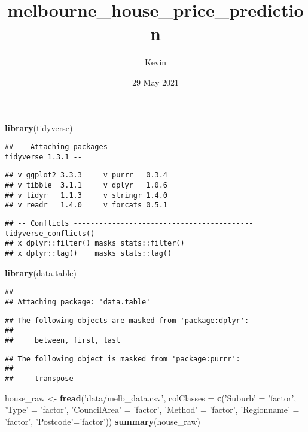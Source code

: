 \documentclass[]{article}
\title{melbourne\_house\_price\_prediction}
\author{Kevin}
\date{29 May 2021}
\newenvironment{Shaded}{\begin{snugshade}}{\end{snugshade}}
\newcommand{\DataTypeTok}[1]{\textcolor[rgb]{0.13,0.29,0.53}{#1}}
\newcommand{\KeywordTok}[1]{\textcolor[rgb]{0.13,0.29,0.53}{\textbf{#1}}}
\newcommand{\NormalTok}[1]{#1}
\newcommand{\StringTok}[1]{\textcolor[rgb]{0.31,0.60,0.02}{#1}}
\begin{document}
\maketitle

\begin{Shaded}
\begin{Highlighting}[]
\KeywordTok{library}\NormalTok{(tidyverse)}
\end{Highlighting}
\end{Shaded}

\begin{verbatim}
## -- Attaching packages --------------------------------------- tidyverse 1.3.1 --
\end{verbatim}

\begin{verbatim}
## v ggplot2 3.3.3     v purrr   0.3.4
## v tibble  3.1.1     v dplyr   1.0.6
## v tidyr   1.1.3     v stringr 1.4.0
## v readr   1.4.0     v forcats 0.5.1
\end{verbatim}

\begin{verbatim}
## -- Conflicts ------------------------------------------ tidyverse_conflicts() --
## x dplyr::filter() masks stats::filter()
## x dplyr::lag()    masks stats::lag()
\end{verbatim}

\begin{Shaded}
\begin{Highlighting}[]
\KeywordTok{library}\NormalTok{(data.table)}
\end{Highlighting}
\end{Shaded}

\begin{verbatim}
## 
## Attaching package: 'data.table'
\end{verbatim}

\begin{verbatim}
## The following objects are masked from 'package:dplyr':
## 
##     between, first, last
\end{verbatim}

\begin{verbatim}
## The following object is masked from 'package:purrr':
## 
##     transpose
\end{verbatim}

\begin{Shaded}
\begin{Highlighting}[]
\NormalTok{house_raw <-}\StringTok{ }\KeywordTok{fread}\NormalTok{(}\StringTok{'data/melb_data.csv'}\NormalTok{, }\DataTypeTok{colClasses =} \KeywordTok{c}\NormalTok{(}\StringTok{'Suburb'}\NormalTok{ =}\StringTok{ 'factor'}\NormalTok{, }\StringTok{'Type'}\NormalTok{ =}\StringTok{ 'factor'}\NormalTok{, }\StringTok{'CouncilArea'}\NormalTok{ =}\StringTok{ 'factor'}\NormalTok{,}
                                                        \StringTok{'Method'}\NormalTok{ =}\StringTok{ 'factor'}\NormalTok{, }\StringTok{'Regionname'}\NormalTok{ =}\StringTok{ 'factor'}\NormalTok{, }\StringTok{'Postcode'}\NormalTok{=}\StringTok{'factor'}\NormalTok{))}
\KeywordTok{summary}\NormalTok{(house_raw)}
\end{Highlighting}
\end{Shaded}
\end{document}

